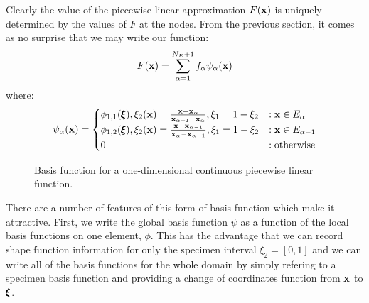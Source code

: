 \documentclass[a4paper, 11pt]{book}
\newcommand{\ifhtlatex}[2]{\ifthenelse{\boolean{HTLatex}}{#1}{#2}}
\newcommand{\xfig}[1]{
  \ifhtlatex{
    \texttt{[image: \#1.png]}
  }{
    
  }
}
\begin{document}
Clearly the value of the piecewise linear approximation $F(\mathbf{x})$ is uniquely
determined by the values of $F$ at the nodes. From the previous section,
it comes as no surprise that we may write our function:
\begin{equation}\label{eq:globalsum}
  F(\mathbf{x}) = \sum_{\alpha=1}^{N_E+1} f_\alpha\psi_\alpha(\mathbf{x})
\end{equation}
where:
\begin{equation}\label{eq:globalbasis}
  \psi_\alpha(\mathbf{x}) =
  \begin{cases}
    \phi_{1,1}(\pmb{\xi}), \xi_2(\mathbf{x})=\frac{\mathbf{x}-\mathbf{x}_\alpha}{\mathbf{x}_{\alpha+1}-\mathbf{x}_\alpha}, \xi_1=1-\xi_2&:
    \mathbf{x}\in E_{\alpha}\\
    \phi_{1,2}(\pmb{\xi}), \xi_2(\mathbf{x})=\frac{\mathbf{x}-\mathbf{x}_{\alpha-1}}{\mathbf{x}_{\alpha}-\mathbf{x}_{\alpha-1}}, \xi_1=1-\xi_2 &:
    \mathbf{x}\in E_{\alpha-1}\\    
    0 &: \textrm{otherwise}
  \end{cases}
\end{equation}
\begin{figure}[ht]
  \centering
  \xfig{linear_1d_basis}
  \caption{Basis function for a one-dimensional continuous piecewise linear function.}
\end{figure}
There are a number of features of this form of basis function which make it
attractive. First, we write the global basis function $\psi$ as a function
of the local basis functions on one element, $\phi$. This has the advantage
that we can record shape function information for only the specimen interval
$\xi_2=[0,1]$ and we can write all of the basis functions for the whole
domain by simply refering to a specimen basis function and providing a
change of coordinates function from $\mathbf{x}$ to $\pmb{\xi}$. 
\end{document}
